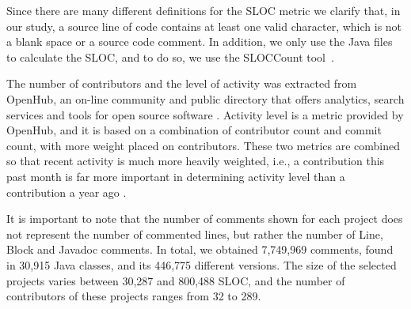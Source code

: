 Since there are many different definitions for the SLOC metric we clarify that, in our study, a source line of code contains at least one valid character, which is not a blank space or a source code comment. In addition, we only use the Java files to calculate the SLOC, and to do so, we use the SLOCCount tool~\cite{wheeler2004:home}. 

The number of contributors and the level of activity was extracted from OpenHub, an on-line community and public directory that offers analytics, search services and tools for open source software \cite{Openhub:home}. Activity level is a metric provided by OpenHub, and it is based on a combination of contributor count and commit count, with more weight placed on contributors. These two metrics are combined so that recent activity is much more heavily weighted, i.e., a contribution this past month is far more important in determining activity level than a contribution a year ago \cite{Openhub:activity_level}. 

It is important to note that the number of comments shown for each project does not represent the number of commented lines, but rather the number of Line, Block and Javadoc comments.
 In total, we obtained 7,749,969 comments, found in 30,915 Java classes, and its 446,775 different versions. The size of the selected projects varies between 30,287 and 800,488 SLOC, and the number of contributors of these projects ranges from 32 to 289. 

